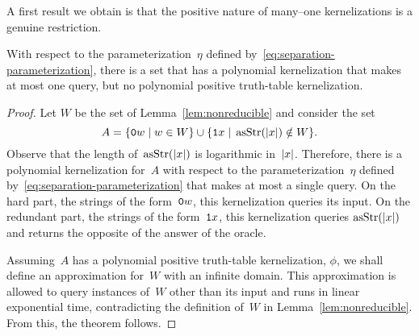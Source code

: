 A first result we obtain is that the positive nature of many--one kernelizations is a genuine restriction.
\begin{theorem}
\label{thm:hpositive}%
  With respect to the parameterization~$\eta$ defined by~\eqref{eq:separation-parameterization}, there is a set that has a polynomial kernelization that makes at most one query, but no polynomial positive truth-table kernelization.
\end{theorem}
\begin{proof}
  Let $W$ be the set of Lemma~\ref{lem:nonreducible} and consider the set
  \begin{equation*}
    A = \{\textnormal{\texttt{0}}w \;|\; w \in W\} \cup \{\textnormal{\texttt{1}}x \;|\; \operatorname{asStr}({\lvert x\rvert}) \notin W\}.
  \end{equation*}
  Observe that the length of~$\operatorname{asStr}({\lvert x\rvert})$ is logarithmic in~${\lvert x\rvert}$.
  Therefore, there is a polynomial kernelization for~$A$ with respect to the parameterization~$\eta$ defined by~\eqref{eq:separation-parameterization} that makes at most a single query.
  On the hard part, the strings of the form~$\textnormal{\texttt{0}}w$, this kernelization queries its input.
  On the redundant part, the strings of the form~$\textnormal{\texttt{1}}x$, this kernelization queries $\operatorname{asStr}({\lvert x\rvert})$ and returns the opposite of the answer of the oracle.

  Assuming~$A$ has a polynomial positive truth-table kernelization, $\phi$, we shall define an approximation for~$W$ with an infinite domain.
  This approximation is allowed to query instances of~$W$ other than its input and runs in linear exponential time, contradicting the definition of~$W$ in Lemma~\ref{lem:nonreducible}.
  From this, the theorem follows.


\end{proof}

